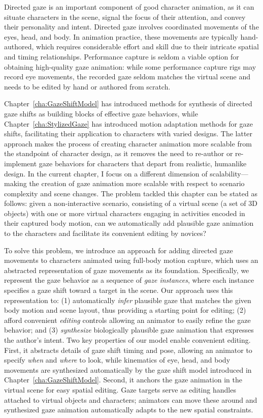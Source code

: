 Directed gaze is an important component of good character animation, as it can situate characters in the scene, signal the focus of their attention, and convey their personality and intent. Directed gaze involves coordinated movements of the eyes, head, and body. In animation practice, these movements are typically hand-authored, which requires considerable effort and skill due to their intricate spatial and timing relationships. Performance capture is seldom a viable option for obtaining high-quality gaze animation: while some performance capture rigs may record eye movements, the recorded gaze seldom matches the virtual scene and needs to be edited by hand or authored from scratch.

Chapter~\ref{cha:GazeShiftModel} has introduced methods for synthesis of directed gaze shifts as building blocks of effective gaze behaviors, while Chapter~\ref{cha:StylizedGaze} has introduced motion adaptation methods for gaze shifts, facilitating their application to characters with varied designs. The latter approach makes the process of creating character animation more scalable from the standpoint of character design, as it removes the need to re-author or re-implement gaze behaviors for characters that depart from realistic, humanlike design. In the current chapter, I focus on a different dimension of scalability---making the creation of gaze animation more scalable with respect to scenario complexity and scene changes. The problem tackled this chapter can be stated as follows: given a non-interactive scenario, consisting of a virtual scene (a set of 3D objects) with one or more virtual characters engaging in activities encoded in their captured body motion, can we automatically add plausible gaze animation to the characters and facilitate its convenient editing by novices?

To solve this problem, we introduce an approach for adding directed gaze movements to characters animated using full-body motion capture, which uses an abstracted representation of gaze movements as its foundation. Specifically, we represent the gaze behavior as a sequence of \emph{gaze instances}, where each instance specifies a gaze shift toward a target in the scene. Our approach uses this representation to: (1) automatically \emph{infer} plausible gaze that matches the given body motion and scene layout, thus providing a starting point for editing; (2) afford convenient \emph{editing} controls allowing an animator to easily refine the gaze behavior; and (3) \emph{synthesize} biologically plausible gaze animation that expresses the author's intent. Two key properties of our model enable convenient editing. First, it abstracts details of gaze shift timing and pose, allowing an animator to specify \emph{when} and \emph{where} to look, while kinematics of eye, head, and body movements are synthesized automatically by the gaze shift model introduced in Chapter~\ref{cha:GazeShiftModel}. Second, it anchors the gaze animation in the virtual scene for easy spatial editing. Gaze targets serve as editing handles attached to virtual objects and characters; animators can move these around and synthesized gaze animation automatically adapts to the new spatial constraints.

